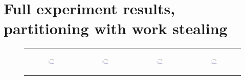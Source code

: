 ~\newpage\section{Full experiment results,  partitioning with work stealing}
\label{app:exptresults_partition}
\begin{figure}[ht]
  \centering
  \begin{tabular}{cccc}
	  \begin{subfigure}[b]{0.22\textwidth}
	  	\includegraphics[width=110pt]{images_partition/runtime_erdosrenyi_maxgraphcut.eps}
			\caption{}
			\label{appfig:partition:runtime_erdosrenyi_maxgraphcut}
	  \end{subfigure} &
	  \begin{subfigure}[b]{0.22\textwidth}
	  	\includegraphics[width=110pt]{images_partition/runtime_erdosrenyi_setcover.eps}
			\caption{}
			\label{appfig:partition:runtime_erdosrenyi_setcover}
	  \end{subfigure} &
	  \begin{subfigure}[b]{0.22\textwidth}
	  	\includegraphics[width=110pt]{images_partition/runtime_zigzag_maxgraphcut.eps}
			\caption{}
			\label{appfig:partition:runtime_zigzag_maxgraphcut}
	  \end{subfigure} &
	  \begin{subfigure}[b]{0.22\textwidth}
	  	\includegraphics[width=110pt]{images_partition/runtime_zigzag_setcover.eps}

\end{subfigure}
\end{tabular}
\end{figure}
